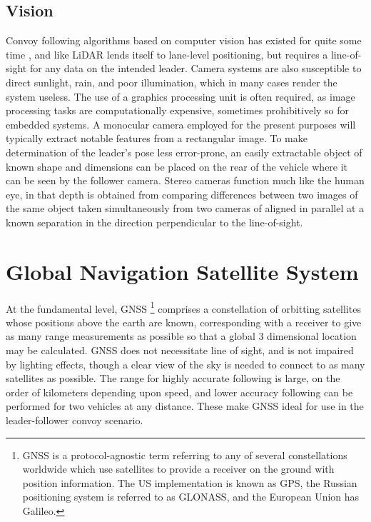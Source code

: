 \documentclass[12pt]{report}
\begin{document}
\subsection{Vision}
Convoy following algorithms based on computer vision has existed for quite some time \cite{visionrec}, and like LiDAR lends itself to lane-level positioning, but requires a line-of-sight for any data on the intended leader. Camera systems are also susceptible to direct sunlight, rain, and poor illumination, which in many cases render the system useless. The use of a graphics processing unit is often required, as image processing tasks are computationally expensive, sometimes prohibitively so for embedded systems.
A monocular camera employed for the present purposes will typically extract notable features from a rectangular image. To make determination of the leader's pose less error-prone, an easily extractable object of known shape and dimensions can be placed on the rear of the vehicle where it can be seen by the follower camera.
Stereo cameras function much like the human eye, in that depth is obtained from comparing differences between two images of the same object taken simultaneously from two cameras of aligned in parallel at a known separation in the direction perpendicular to the line-of-sight.


\section{Global Navigation Satellite System}

At the fundamental level, GNSS
\footnote{GNSS is a protocol-agnostic term referring to any of several constellations worldwide which use satellites to provide a receiver on the ground with position information. The US implementation is known as GPS, the Russian positioning system is referred to as GLONASS, and the European Union has Galileo.}
comprises a constellation of orbitting satellites whose positions above the earth are known, corresponding with a receiver to give as many range measurements as possible so that a global 3 dimensional location may be calculated. GNSS does not necessitate line of sight, and is not impaired by lighting effects, though a clear view of the sky is needed to connect to as many satellites as possible. The range for highly accurate following is large, on the order of kilometers depending upon speed, and lower accuracy following can be performed for two vehicles at any distance. These make GNSS ideal for use in the leader-follower convoy scenario.
\end{document}
